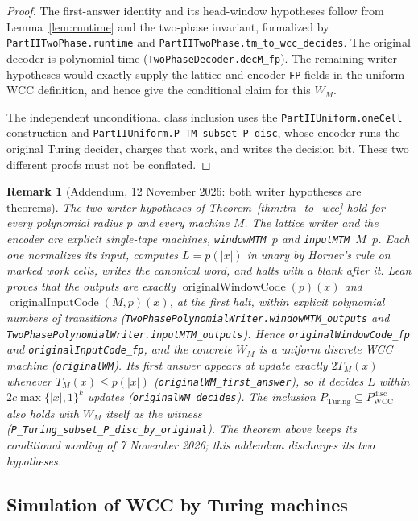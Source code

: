 \documentclass[12pt]{article}
\newtheorem{remark}[theorem]{Remark}
\begin{document}
\begin{proof}
The first-answer identity and its head-window
hypotheses follow from Lemma~\ref{lem:runtime}
and the two-phase invariant, formalized by
\nolinkurl{PartIITwoPhase.runtime} and
\nolinkurl{PartIITwoPhase.tm_to_wcc_decides}.
The original decoder is polynomial-time
(\nolinkurl{TwoPhaseDecoder.decM_fp}).
The remaining writer hypotheses would exactly
supply the lattice and encoder \texttt{FP}
fields in the uniform WCC definition, and
hence give the conditional claim for this $W_M$.

The independent unconditional class inclusion
uses the \texttt{PartIIUniform.oneCell} construction
and \nolinkurl{PartIIUniform.P_TM_subset_P_disc},
whose encoder runs the original Turing decider,
charges that work, and writes the decision bit.
These two different proofs must not be conflated.
\end{proof}

\begin{remark}[Addendum, 12 November 2026: both writer hypotheses are theorems]
\label{rem:tm_to_wcc_writers}
The two writer hypotheses of Theorem~\ref{thm:tm_to_wcc} hold for
every polynomial radius $p$ and every machine $M$.  The lattice
writer and the encoder are explicit single-tape machines,
\texttt{windowMTM}~$p$ and \texttt{inputMTM}~$M$~$p$.  Each one
normalizes its input, computes $L=p(|x|)$ in unary by Horner's rule
on marked work cells, writes the canonical word, and halts with a
blank after it.  Lean proves that the outputs are exactly
$\operatorname{originalWindowCode}(p)(x)$ and
$\operatorname{originalInputCode}(M,p)(x)$, at the first halt, within
explicit polynomial numbers of transitions
(\nolinkurl{TwoPhasePolynomialWriter.windowMTM_outputs} and
\nolinkurl{TwoPhasePolynomialWriter.inputMTM_outputs}).  Hence
\nolinkurl{originalWindowCode_fp} and
\nolinkurl{originalInputCode_fp}, and the concrete $W_M$ is a uniform
discrete WCC machine (\nolinkurl{originalWM}).  Its first answer
appears at update exactly $2T_M(x)$ whenever $T_M(x)\le p(|x|)$
(\nolinkurl{originalWM_first_answer}), so it decides $L$ within
$2c\max\{|x|,1\}^k$ updates (\nolinkurl{originalWM_decides}).  The
inclusion $P_{\mathrm{Turing}}\subseteq P_{\mathrm{WCC}}^{\mathrm{disc}}$
also holds with $W_M$ itself as the witness
(\nolinkurl{P_Turing_subset_P_disc_by_original}).  The theorem above
keeps its conditional wording of 7 November 2026; this addendum
discharges its two hypotheses.
\end{remark}

\subsection{Simulation of WCC by Turing machines}
\end{document}
